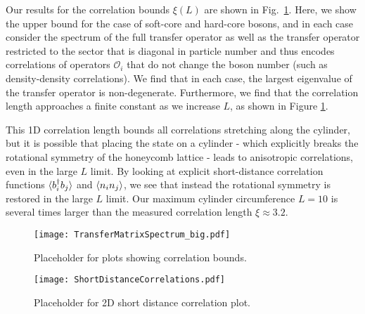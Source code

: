 Our results for the correlation bounds $\xi(L)$ are shown in Fig.~\ref{fig:TMS}.
Here, we show the upper bound for the case of soft-core and hard-core bosons,
and in each case consider the spectrum of the full transfer operator as well
as the transfer operator restricted to the sector that is diagonal in particle
number and thus encodes correlations of operators $\mathcal{O}_i$ that do not
change the boson number (such as density-density correlations).
We find that in each case, the largest eigenvalue of the transfer operator is
non-degenerate. Furthermore, we find
that the correlation length approaches a finite constant as we
increase $L$, as shown in Figure \ref{fig:TMS}.

This 1D correlation length bounds all correlations stretching along
the cylinder, but it is possible that placing the state on a cylinder
- which explicitly breaks the rotational symmetry of the honeycomb
lattice - leads to anisotropic correlations, even in the large $L$
limit. By looking at explicit short-distance correlation functions
$\langle b_i^{\dagger} b_j \rangle$ and $\langle n_i n_j \rangle$, we see that instead the
rotational symmetry is restored in the large $L$ limit. Our maximum
cylinder circumference $L=10$ is several times larger than the
measured correlation length $\xi \approx 3.2$.

\begin{figure}[hbtc]
	\centering
	\texttt{[image: TransferMatrixSpectrum\_big.pdf]}
	\caption{Placeholder for plots showing correlation bounds.}
	\label{fig:TMS}
\end{figure}

\begin{figure}[hbtc]
	\centering
	\texttt{[image: ShortDistanceCorrelations.pdf]}
	\caption{Placeholder for 2D short distance correlation plot.}
	\label{fig:ShortCorr}
\end{figure}
